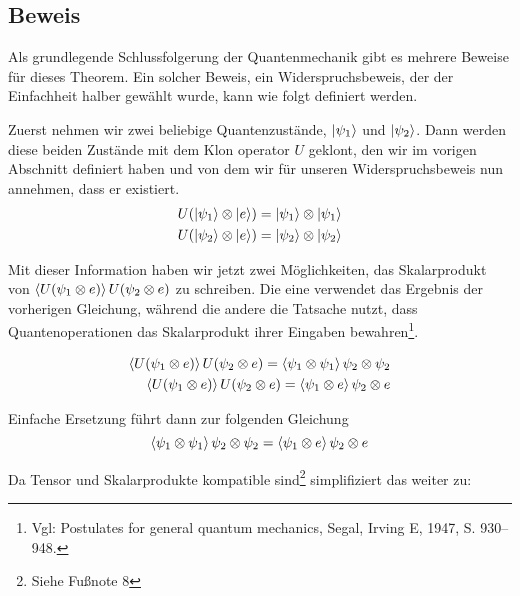 \subsection{Beweis}\label{subsec:proof}
Als grundlegende Schlussfolgerung der Quantenmechanik gibt es mehrere Beweise für dieses Theorem.
Ein solcher Beweis, ein Widerspruchsbeweis, der der Einfachheit halber gewählt wurde, kann wie folgt definiert werden.

Zuerst nehmen wir zwei beliebige Quantenzustände, $\ket{\psi_1}$ und $\ket{\psi_2}$.
Dann werden diese beiden Zustände mit dem Klon operator $U$ geklont, den wir im vorigen Abschnitt definiert haben
und von dem wir für unseren Widerspruchsbeweis nun annehmen, dass er existiert.
\begin{equation}
\begin{split}
    U(\ket{\psi_1} \otimes \ket{e}) = \ket{\psi_1} \otimes \ket{\psi_1}\\
    U(\ket{\psi_2} \otimes \ket{e}) = \ket{\psi_2} \otimes \ket{\psi_2}
\end{split}\label{eq:clone_two_states}
\end{equation}

Mit dieser Information haben wir jetzt zwei Möglichkeiten, das Skalarprodukt von
$\braket{U(\psi_1 \otimes e)}{U(\psi_2 \otimes e)}$ zu schreiben.
Die eine verwendet das Ergebnis der vorherigen Gleichung, während die andere die Tatsache nutzt,
dass Quantenoperationen das Skalarprodukt ihrer Eingaben bewahren\footnote{Vgl: Postulates for general quantum mechanics, Segal, Irving E, 1947, S. 930--948.}.

\begin{equation}
\begin{split}
    \braket{U(\psi_1 \otimes e)}{U(\psi_2 \otimes e)} = \braket{\psi_1 \otimes \psi_1}{\psi_2 \otimes \psi_2}\\
    \braket{U(\psi_1 \otimes e)}{U(\psi_2 \otimes e)} = \braket{\psi_1 \otimes e}{\psi_2 \otimes e}
\end{split}\label{eq:two_scalar_products}
\end{equation}

Einfache Ersetzung führt dann zur folgenden Gleichung
\begin{equation}
    \braket{\psi_1 \otimes \psi_1}{\psi_2 \otimes \psi_2} =
    \braket{\psi_1 \otimes e}{\psi_2 \otimes e}
\label{eq:tensor_equals}
\end{equation}

Da Tensor und Skalarprodukte kompatible sind\footnote{Siehe Fußnote 8} simplifiziert das weiter zu:

